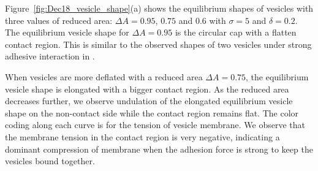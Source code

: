 \documentclass[aps,prl,twocolumn,showpacs,amsmath,amssymb]{revtex4-1}
\begin{document}
Figure~\ref{fig:Dec18_vesicle_shape}(a) shows the equilibrium shapes of vesicles with
three values of reduced area: $\Delta A=0.95$, $0.75$ and $0.6$ with $\sigma=5$ and $\delta = 0.2$.
The equilibrium vesicle shape for $\Delta A=0.95$ is the circular cap with a flatten contact region. 
This is similar to the observed shapes of two vesicles under strong adhesive interaction in \cite{RamachandranAndersonLealIsraelachvili2010_Langmuir}.

When vesicles are more deflated with a reduced area  $\Delta A = 0.75$, the equilibrium vesicle shape is elongated with a bigger contact region.
As the reduced area decreases further, we observe undulation of the elongated equilibrium vesicle shape on the non-contact side while the contact region remains flat. 
The color coding along each curve is for the tension of vesicle membrane.
We observe that the membrane tension in the contact region is very negative, indicating a dominant compression of membrane when the adhesion force is strong to keep the vesicles bound together.
\end{document}
